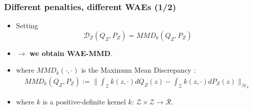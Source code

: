 \documentclass{beamer}
\begin{document}
\begin{frame}
\frametitle{Different penalties, different WAEs (1/2)}
\begin{itemize}
  \item Setting $$ \mathcal{D}_Z(Q_Z,P_Z) = MMD_k(Q_Z, P_Z) $$
  \vspace*{-\baselineskip}
  \item[]$\rightarrow$ \textbf{we obtain WAE-MMD}.
  \bigskip
  \item where $MMD_k(\cdot,\cdot)$ is the Maximum Mean Discrepancy \cite{mmd}:
  \begin{align*}
    MMD_\mathit{k}(Q_Z,P_Z) := \Big\| \int_{\mathcal{Z}} \mathit{k}(z, \cdot)dQ_Z(z) -
      \int_{\mathcal{Z}} \mathit{k}(z, \cdot)dP_Z(z)\Big\|_{\mathcal{H}_k}
  \end{align*}
  \item where $k$ is a positive-definite kernel $k$: $\mathcal{Z} \times \mathcal{Z} \rightarrow \mathcal{R} $.
\end{itemize}
\end{frame}
\end{document}
